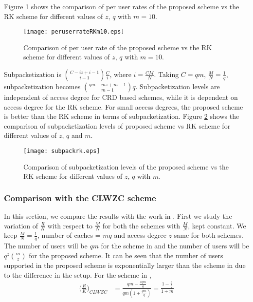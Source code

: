\documentclass[conference]{IEEEtran}
\begin{document}
		Figure \ref{fig3} shows the comparison of per user rates of the proposed scheme vs the RK scheme for different values of $z$, $q$ with $m = 10$.
\begin{figure}
			\texttt{[image: peruserrateRKm10.eps]}
			\begin{center}
				\caption {Comparison of per user rate of the proposed scheme vs the RK scheme for different values of $z$, $q$ with $m = 10$.}
				\label{fig3}
			\end{center}
\end{figure} 
Subpacketization is $ \binom{C - iz + i-1}{i-1} \frac{C}{i}$, where $i = \frac{CM}{N}$. Taking $C = qm$, $\frac{M}{N}= \frac{1}{q}$, subpacketization becomes $ \binom{qm - mz + m-1}{m-1} q$. 	Subpacketization levels are independent of access degree for CRD based schemes, while it is dependent on access degree for the RK scheme. For small access degrees, the proposed scheme is better than the RK scheme in terms of subpacketization. Figure \ref{fig4} shows the comparison of subpacketization levels of proposed scheme vs RK scheme for different values of $z$, $q$ and $m$.
\begin{figure}
			\texttt{[image: subpackrk.eps]}
			\begin{center}
				\caption {Comparison of subpacketization levels of the proposed scheme vs the RK scheme for different values of $z$, $q$ with $m$.}
				\label{fig4}
			\end{center}
\end{figure} 
\subsubsection{Comparison with the CLWZC scheme  \cite{CLWZC} }
In this section, we  compare the results with the work in \cite{CLWZC}. First we study the variation of $\frac{R}{K}$ with respect to $\frac{M}{N}$ for both the schemes with $\frac{M}{N}$, kept constant. 
		We keep $\frac{M}{N} = \frac{1}{q}$, number of caches = $mq$ and access degree $z$ same for both schemes. The number of users will be $qm$ for the scheme in \cite{CLWZC} and the number of users will be $q^z \binom{m}{z}$ for the proposed scheme. It can be seen that the number of users supported in the proposed scheme is exponentially larger than the scheme in \cite{CLWZC} due to the difference in the setup. 
		For the scheme in \cite{CLWZC},\\
		\begin{align*}
		\Big(\frac{R}{K}\Big)_{CLWZC} &= \frac{qm - \frac{zqm}{q}}{qm(1 + \frac{qm}{q})} = \frac{1 - \frac{z}{q}}{1 + m}
		\end{align*}
		
\end{document}
